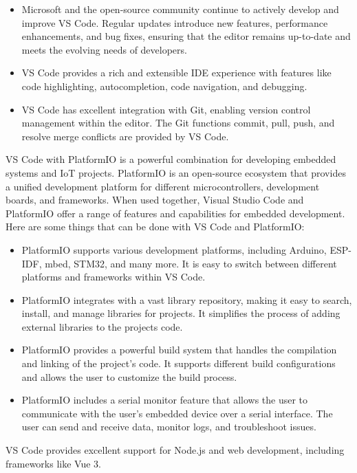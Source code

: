 \begin{itemize}
  \item Microsoft and the open-source community continue to actively develop and improve \ac{VS Code}. Regular updates introduce new features, performance enhancements, and bug fixes, ensuring that the editor remains up-to-date and meets the evolving needs of developers.
  \item \ac{VS Code} provides a rich and extensible \ac{IDE} experience with features like code highlighting, autocompletion, code navigation, and debugging.
  \item \ac{VS Code} has excellent integration with Git, enabling version control management within the editor. The Git functions commit, pull, push, and resolve merge conflicts are provided by \ac{VS Code}.
\end{itemize}
\ac{VS Code} with PlatformIO is a powerful combination for developing embedded systems and \ac{IoT} projects. PlatformIO is an open-source ecosystem that provides a unified development platform for different microcontrollers, development boards, and frameworks. When used together, Visual Studio Code and PlatformIO offer a range of features and capabilities for embedded development. Here are some things that can be done with \ac{VS Code} and PlatformIO:
\begin{itemize}
  \item PlatformIO supports various development platforms, including Arduino, ESP-IDF, mbed, STM32, and many more. It is easy to switch between different platforms and frameworks within \ac{VS Code}.
  \item PlatformIO integrates with a vast library repository, making it easy to search, install, and manage libraries for projects. It simplifies the process of adding external libraries to the projects code.
  \item PlatformIO provides a powerful build system that handles the compilation and linking of the project's code. It supports different build configurations and allows the user to customize the build process.
  \item PlatformIO includes a serial monitor feature that allows the user to communicate with the user's embedded device over a serial interface. The user can send and receive data, monitor logs, and troubleshoot issues.
\end{itemize}
\ac{VS Code} provides excellent support for Node.js and web development, including frameworks like Vue 3. 
